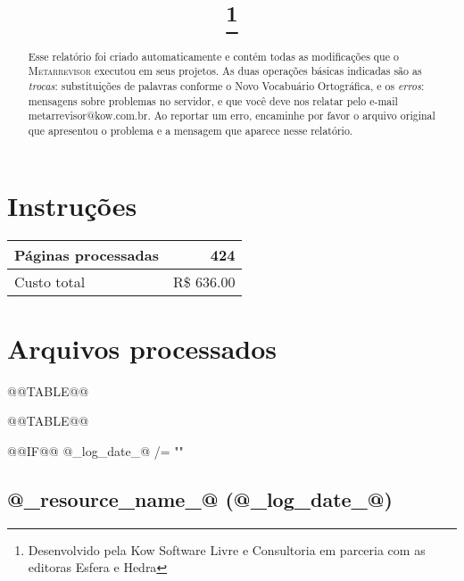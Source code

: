 \documentclass{article}
\title{\Huge \textls{\textsc{metarrevisor}}\footnote{Desenvolvido pela Kow Software Livre e Consultoria em parceria com as editoras Esfera e Hedra}}
\newcommand\money[1]{R\$ #1}		%
\begin{document}
\maketitle


\begin{abstract}
Esse relatório foi criado automaticamente e contém todas as modificações 
que o \textsc{Metarrevisor} executou em seus projetos. 
As duas operações básicas indicadas são as \textit{trocas}: substituições
de palavras  conforme o Novo Vocabuário Ortográfica, e os \textit{erros}:
mensagens sobre problemas no servidor, e que você deve nos relatar
pelo e-mail metarrevisor@kow.com.br. Ao reportar um erro,  encaminhe por favor o 
arquivo original que apresentou o problema e a mensagem que aparece nesse relatório.
\end{abstract}


\setcounter{tocdepth}{2}            %
\setcounter{secnumdepth}{1}   %
\tableofcontents

\section{Instruções}

\begin{center}
\begin{xtabular}{lr}
	\hline
	Páginas processadas	&  424 \\
	\hline
	Custo total		& \money{ 636.00} \\
	\hline
\end{xtabular}
\end{center}

\section{Arquivos processados}



\newcommand\projectname[0]{nada}


@@TABLE@@
	\renewcommand\projectname[0]{@_project_name_@}

	@@TABLE@@

	@@IF@@ @_log_date_@ /= ""
	\subsection{@_resource_name_@ (@_log_date_@)}
\end{document}
